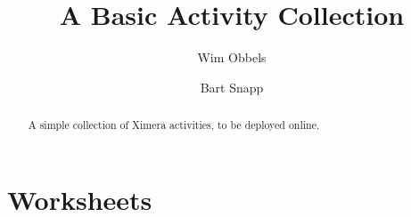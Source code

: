 \documentclass{xourse}
\author{Wim Obbels \and Bart Snapp}
\title{A Basic Activity Collection}
\begin{document}
\begin{abstract}
    A simple collection of Ximera activities, to be deployed online.
\end{abstract}
\maketitle


\part{Worksheets}
    \chapterstyle %
\end{document}
